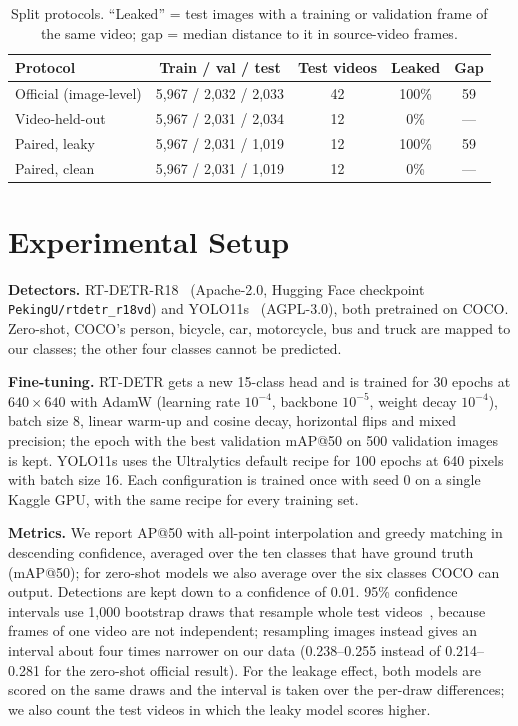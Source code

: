\documentclass[conference]{IEEEtran}
\newcommand{\vid}[1]{\texttt{#1}}            %
\begin{document}
\begin{table}[t]
\centering
\caption{Split protocols. ``Leaked'' = test images with a training or validation frame of the same video;
gap = median distance to it in source-video frames.}
\label{tab:splits}
\setlength{\tabcolsep}{4pt}
\begin{tabular}{@{}lcccc@{}}
\toprule
Protocol & Train / val / test & Test videos & Leaked & Gap \\
\midrule
Official (image-level) & 5,967 / 2,032 / 2,033 & 42 & 100\% & 59 \\
Video-held-out        & 5,967 / 2,031 / 2,034 & 12 & 0\% & --- \\
Paired, leaky         & 5,967 / 2,031 / 1,019 & 12 & 100\% & 59 \\
Paired, clean         & 5,967 / 2,031 / 1,019 & 12 & 0\% & --- \\
\bottomrule
\end{tabular}
\end{table}

\section{Experimental Setup}

\textbf{Detectors.} RT-DETR-R18~\cite{rtdetr} (Apache-2.0, Hugging Face checkpoint
\vid{PekingU/rtdetr\_r18vd}) and YOLO11s~\cite{yolo11} (AGPL-3.0), both pretrained on COCO. Zero-shot, COCO's
person, bicycle, car, motorcycle, bus and truck are mapped to our classes; the other four classes cannot be
predicted.

\textbf{Fine-tuning.} RT-DETR gets a new 15-class head and is trained for 30 epochs at $640\times640$ with
AdamW (learning rate $10^{-4}$, backbone $10^{-5}$, weight decay $10^{-4}$), batch size 8, linear warm-up
and cosine decay, horizontal flips and mixed precision; the epoch with the best validation mAP@50 on 500
validation images is kept. YOLO11s uses the Ultralytics default recipe for 100 epochs at 640 pixels with
batch size 16. Each configuration is trained once with seed 0 on a single Kaggle GPU, with the same recipe
for every training set.

\textbf{Metrics.} We report AP@50 with all-point interpolation and greedy matching in descending confidence,
averaged over the ten classes that have ground truth (mAP@50); for zero-shot models we also average over the
six classes COCO can output. Detections are kept down to a confidence of 0.01. 95\% confidence intervals use
1,000 bootstrap draws that resample whole test videos~\cite{fieldwelsh}, because frames of one video are not
independent; resampling images instead gives an interval about four times narrower on our data
(0.238--0.255 instead of 0.214--0.281 for the zero-shot official result). For the leakage effect, both models are scored
on the same draws and the interval is taken over the per-draw differences; we also count the test videos in
which the leaky model scores higher.
\end{document}
